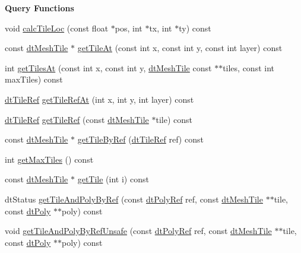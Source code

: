 \begin{Indent}\textbf{ Query Functions}\par
\begin{DoxyCompactItemize}
\item 
void \hyperlink{classdtNavMesh_a609d55c59062910ff645dbbd4c72fed1}{calc\+Tile\+Loc} (const float $\ast$pos, int $\ast$tx, int $\ast$ty) const
\item 
const \hyperlink{structdtMeshTile}{dt\+Mesh\+Tile} $\ast$ \hyperlink{classdtNavMesh_aecd08fb7ce20324cd18de51a834ff2ef}{get\+Tile\+At} (const int x, const int y, const int layer) const
\item 
int \hyperlink{classdtNavMesh_a1a89053de47c9ed459d598fc7f739670}{get\+Tiles\+At} (const int x, const int y, \hyperlink{structdtMeshTile}{dt\+Mesh\+Tile} const $\ast$$\ast$tiles, const int max\+Tiles) const
\item 
\hyperlink{group__detour_ga7ea56cfe01bd7c34a81d821d94cbeea5}{dt\+Tile\+Ref} \hyperlink{classdtNavMesh_a88f53f80fa95524b1e7197dface10948}{get\+Tile\+Ref\+At} (int x, int y, int layer) const
\item 
\hyperlink{group__detour_ga7ea56cfe01bd7c34a81d821d94cbeea5}{dt\+Tile\+Ref} \hyperlink{classdtNavMesh_a6027a9a6f032dfd6a3b72563f17d80d7}{get\+Tile\+Ref} (const \hyperlink{structdtMeshTile}{dt\+Mesh\+Tile} $\ast$tile) const
\item 
const \hyperlink{structdtMeshTile}{dt\+Mesh\+Tile} $\ast$ \hyperlink{classdtNavMesh_ac7924d8eeed5c67b04d2d23d0cc766ad}{get\+Tile\+By\+Ref} (\hyperlink{group__detour_ga7ea56cfe01bd7c34a81d821d94cbeea5}{dt\+Tile\+Ref} ref) const
\item 
int \hyperlink{classdtNavMesh_a17672fe19464d55eb66dc69f5f2f2b3f}{get\+Max\+Tiles} () const
\item 
const \hyperlink{structdtMeshTile}{dt\+Mesh\+Tile} $\ast$ \hyperlink{classdtNavMesh_a52bb4f57b24a139600cfb6aeec1d9bcd}{get\+Tile} (int i) const
\item 
dt\+Status \hyperlink{classdtNavMesh_a36a84aa7296d5cc257eb3ddc38181253}{get\+Tile\+And\+Poly\+By\+Ref} (const \hyperlink{group__detour_gab4e0b2257a670c1a800057999612b466}{dt\+Poly\+Ref} ref, const \hyperlink{structdtMeshTile}{dt\+Mesh\+Tile} $\ast$$\ast$tile, const \hyperlink{structdtPoly}{dt\+Poly} $\ast$$\ast$poly) const
\item 
void \hyperlink{classdtNavMesh_ac5c5b89a6af63b7de29089ae83091e0f}{get\+Tile\+And\+Poly\+By\+Ref\+Unsafe} (const \hyperlink{group__detour_gab4e0b2257a670c1a800057999612b466}{dt\+Poly\+Ref} ref, const \hyperlink{structdtMeshTile}{dt\+Mesh\+Tile} $\ast$$\ast$tile, const \hyperlink{structdtPoly}{dt\+Poly} $\ast$$\ast$poly) const
$$
\end{DoxyCompactItemize}
\end{Indent}
